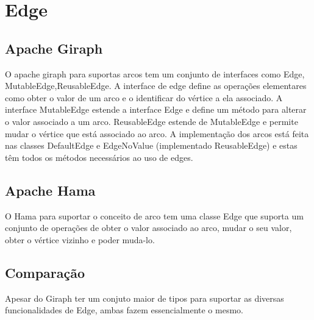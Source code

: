 \newpage
\section{Edge}

\subsection*{Apache Giraph}
O apache giraph para suportas arcos tem um conjunto de interfaces como Edge, MutableEdge,ReusableEdge. A interface de edge define as operações
elementares como obter o valor de um arco e o identificar do vértice a ela associado. A interface MutableEdge estende a interface Edge e define
um método para alterar o valor associado a um arco. ReusableEdge estende de MutableEdge e permite mudar o vértice que está associado ao arco.
A implementação dos arcos está feita nas classes DefaultEdge e EdgeNoValue (implementado ReusableEdge) e estas têm todos os métodos necessários ao uso de edges.

\subsection*{Apache Hama}
O Hama para suportar o conceito de arco tem uma classe Edge que suporta um conjunto de operações de obter o valor associado ao arco, mudar o seu valor,
obter o vértice vizinho e poder muda-lo. 

\subsection*{Comparação}
Apesar do Giraph ter um conjuto maior de tipos para suportar as diversas funcionalidades de Edge, ambas fazem essencialmente
o mesmo.